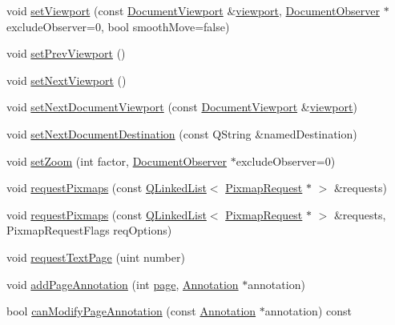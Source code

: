 \begin{DoxyCompactItemize}
\item 
void \hyperlink{classOkular_1_1Document_a1afaf8b8b5cb1e715949024fb75bb767}{set\+Viewport} (const \hyperlink{classOkular_1_1DocumentViewport}{Document\+Viewport} \&\hyperlink{classOkular_1_1Document_abb8738de0a53aa4a9f552de0e1e749f8}{viewport}, \hyperlink{classOkular_1_1DocumentObserver}{Document\+Observer} $\ast$exclude\+Observer=0, bool smooth\+Move=false)
\item 
void \hyperlink{classOkular_1_1Document_accbb6fd94e985749d46f47bfcf03f197}{set\+Prev\+Viewport} ()
\item 
void \hyperlink{classOkular_1_1Document_a47ece85a3cf51760d5f6aa7642a1eeeb}{set\+Next\+Viewport} ()
\item 
void \hyperlink{classOkular_1_1Document_ad7014dea947b69fc28637aba4cbc53ae}{set\+Next\+Document\+Viewport} (const \hyperlink{classOkular_1_1DocumentViewport}{Document\+Viewport} \&\hyperlink{classOkular_1_1Document_abb8738de0a53aa4a9f552de0e1e749f8}{viewport})
\item 
void \hyperlink{classOkular_1_1Document_a96c5a2356ab9416499e2a757ab41aa83}{set\+Next\+Document\+Destination} (const Q\+String \&named\+Destination)
\item 
void \hyperlink{classOkular_1_1Document_a140faece783310fdcbd94eaf3c5ac422}{set\+Zoom} (int factor, \hyperlink{classOkular_1_1DocumentObserver}{Document\+Observer} $\ast$exclude\+Observer=0)
\item 
void \hyperlink{classOkular_1_1Document_a05f652fba2651b2602a2a71f474d008d}{request\+Pixmaps} (const \hyperlink{classQLinkedList}{Q\+Linked\+List}$<$ \hyperlink{classOkular_1_1PixmapRequest}{Pixmap\+Request} $\ast$ $>$ \&requests)
\item 
void \hyperlink{classOkular_1_1Document_a80c2914b996d425ee0f6745df8e62429}{request\+Pixmaps} (const \hyperlink{classQLinkedList}{Q\+Linked\+List}$<$ \hyperlink{classOkular_1_1PixmapRequest}{Pixmap\+Request} $\ast$ $>$ \&requests, Pixmap\+Request\+Flags req\+Options)
\item 
void \hyperlink{classOkular_1_1Document_ad4909d8411d3ad8faf716f30a6e9f417}{request\+Text\+Page} (uint number)
\item 
void \hyperlink{classOkular_1_1Document_a803b34cf352157810214667438f22210}{add\+Page\+Annotation} (int \hyperlink{classOkular_1_1Document_a1c95c2f192d739c217d00971da48f69d}{page}, \hyperlink{classOkular_1_1Annotation}{Annotation} $\ast$annotation)
\item 
bool \hyperlink{classOkular_1_1Document_acbc3b843b40096c18dbeec805552685a}{can\+Modify\+Page\+Annotation} (const \hyperlink{classOkular_1_1Annotation}{Annotation} $\ast$annotation) const 

\end{DoxyCompactItemize}
